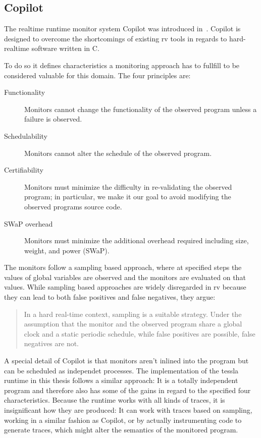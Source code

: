 \subsection{Copilot}
\label{sec:related:c_programs:copilot}

The realtime runtime monitor system Copilot was introduced in~\cite{Pike2010}.
Copilot is designed to overcome the shortcomings of existing \gls{rv} tools in regards to hard-realtime software written in C.

To do so it defines characteristics a monitoring approach has to fullfill to be considered valuable for this domain.
The four principles are:

\begin{description}
  \item[Functionality] Monitors cannot change the functionality of the observed program unless a failure is observed.
  \item[Schedulability] Monitors cannot alter the schedule of the observed program.
  \item[Certifiability] Monitors must minimize the difficulty in re-validating the observed program; in particular, we make it our goal to avoid modifying the observed programs source code.
  \item[SWaP overhead] Monitors must minimize the additional overhead required including size, weight, and power (SWaP).
\end{description}

The monitors follow a sampling based approach, where at specified steps the values of global variables are observed and the monitors are evaluated
on that values.
While sampling based approaches are widely disregarded in \gls{rv} because they can lead to both false positives and false negatives, they argue:

\begin{quote}
  In a hard real-time context, sampling is a suitable strategy.
  Under the assumption that the monitor and the observed program share a global clock and a static periodic schedule, while false positives are possible, false negatives are not.~\cite{Pike2010}
\end{quote}

A special detail of Copilot is that monitors aren't inlined into the program but can be scheduled as independet processes.
The implementation of the \gls{tessla} runtime in this thesis follows a similar approach:
It is a totally independent program and therefore also has some of the gains in regard to the specified four characteristics.
Because the runtime works with all kinds of traces, it is insignificant how they are produced:
It can work with traces based on sampling, working in a similar fashion as Copilot, or by actually instrumenting code to generate traces, which might alter the semantics of the monitored program.


